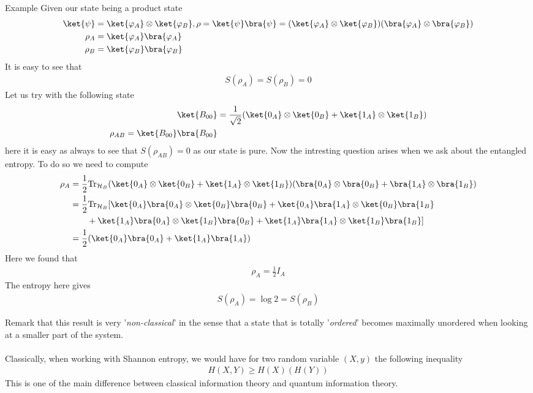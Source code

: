 \begin{parag}{Example}
    Given our state being a product state 
	\begin{align*} 
		\ket{\psi} &= \ket{\varphi_A} \otimes \ket{\varphi_B} , \rho = \ket{\psi}\bra{\psi} = \left(\ket{\varphi_A} \otimes \ket{\varphi_B}\right)\left(\bra{\varphi_A} \otimes \bra{\varphi_B}\right)\\
		\rho_A &= \ket{\varphi_A}\bra{\varphi_A}\\
		\rho_B &= \ket{\varphi_B}\bra{\varphi_B}
	\end{align*}
	It is easy to see that 
	\begin{align*} 
		S\left(\rho_A\right) = S\left(\rho_B\right) = 0
	\end{align*}
	Let us try with the following state 
	\begin{align*} 
		\ket{B_{00}}  &= \frac{1}{\sqrt{2}}\left(\ket{0_A}\otimes\ket{0_B} + \ket{1_A}\otimes \ket{1_B}\right)\\
		\rho_{AB} = \ket{B_{00}}\bra{B_{00}}
	\end{align*}
	here it is easy as always to see that $S\left(\rho_{AB}\right)= 0$ as our state is pure. Now the intresting question arises when we ask about the entangled entropy. To do so we need to compute 
	\begin{align*} 
		\rho_A &= \frac{1}{2}\text{Tr}_{\mathcal{H}_B}\left(\ket{0_A} \otimes \ket{0_B} + \ket{1_A} \otimes \ket{1_B}\right)\left(\bra{0_A} \otimes \bra{0_B} + \bra{1_A} \otimes \bra{1_B}\right)\\
		&= \frac{1}{2}\text{Tr}_{\mathcal{H}_B}[\ket{0_A}\bra{0_A} \otimes \ket{0_B}\bra{0_B} + \ket{0_A}\bra{1_A} \otimes \ket{0_B}\bra{1_B}\\
	&\mathspace \mathspace+ \ket{1_A}\bra{0_A} \otimes \ket{1_B}\bra{0_B} + \ket{1_A}\bra{1_A} \otimes \ket{1_B}\bra{1_B}]\\
		&= \frac{1}{2} \left(\ket{0_A}\bra{0_A} + \ket{1_A}\bra{1_A}\right)
	\end{align*}
	Here we found that 
	\begin{align*} 
		\rho_A = \frac{1}{2}I_A 
	\end{align*}
	The entropy here gives 
	\begin{align*} 
		S\left(\rho_A\right) = \log 2 = S\left(\rho_B\right)
	\end{align*}
\end{parag}
\begin{framedremark}
Remark that this result is very '\textit{non-classical}' in the sense that a state that is totally '\textit{ordered}' becomes maximally unordered when looking at a smaller part of the system.\\
$ $\\
Classically, when working with Shannon entropy, we would have for two random variable $\left(X, y\right)$ the following inequality 
\begin{align*} 
	H\left(X, Y\right) \geq H\left(X\right) \left(H\left(Y\right)\right)
\end{align*}
This is one of the main difference between classical information theory and quantum information theory.
\end{framedremark}
